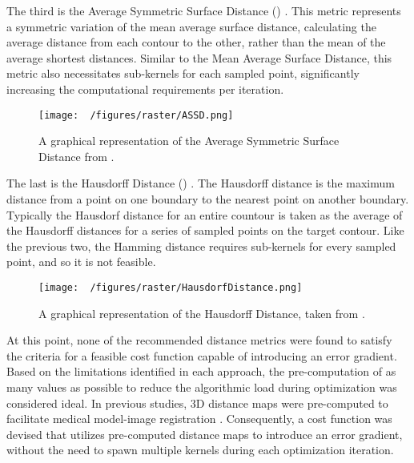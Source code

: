 The third is the Average Symmetric Surface Distance () \cite{yeghiazaryanFamilyBoundaryOverlap2018}.
This metric represents a symmetric variation of the mean average surface distance, calculating the average distance from each contour to the other, rather than the mean of the average shortest distances.
Similar to the Mean Average Surface Distance, this metric also necessitates sub-kernels for each sampled point, significantly increasing the computational requirements per iteration.

\begin{figure}[h!]
  \centering
  \texttt{[image: ~/figures/raster/ASSD.png]}
  \caption{A graphical representation of the Average Symmetric Surface Distance from \cite{reinkeUnderstandingMetricrelatedPitfalls2023,reinkeCommonLimitationsImage2023}.}
  \label{fig:ASSD}
\end{figure}

The last is the Hausdorff Distance () \cite{huttenlocherMultiresolutionTechniqueComparing1993,felzenszwalbDistanceTransformsSampled2012,huttenlocherComparingImagesUsing1993}.
The Hausdorff distance is the maximum distance from a point on one boundary to the nearest point on another boundary. Typically the Hausdorf distance for an entire countour is taken as the average of the Hausdorff distances for a series of sampled points on the target contour.
Like the previous two, the Hamming distance requires sub-kernels for every sampled point, and so it is not feasible.


\begin{figure}[h!]
  \centering
  \texttt{[image: ~/figures/raster/HausdorfDistance.png]}
  \caption{A graphical representation of the Hausdorff Distance, taken from \cite{reinkeCommonLimitationsImage2023,reinkeUnderstandingMetricrelatedPitfalls2023}.}
  \label{fig:HD}
\end{figure}

At this point, none of the recommended distance metrics were found to satisfy the criteria for a feasible cost function capable of introducing an error gradient.
Based on the limitations identified in each approach, the pre-computation of as many values as possible to reduce the algorithmic load during optimization was considered ideal.
In previous studies, 3D distance maps were pre-computed to facilitate medical model-image registration \cite{lavalleeRecoveringPositionOrientation1995,zuffiModelbasedMethodReconstruction1999}.
Consequently, a cost function was devised that utilizes pre-computed distance maps to introduce an error gradient, without the need to spawn multiple kernels during each optimization iteration.



